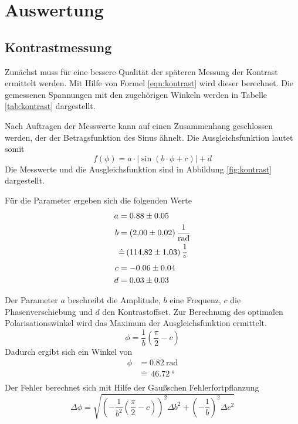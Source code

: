 \section{Auswertung}
\subsection{Kontrastmessung}
Zunächst muss für eine bessere Qualität der späteren Messung der Kontrast
ermittelt werden. Mit Hilfe von Formel \eqref{eqn:kontrast} wird dieser
berechnet. Die gemessenen Spannungen mit den zugehörigen Winkeln werden in
Tabelle \ref{tab:kontrast} dargestellt.



Nach Auftragen der Messwerte kann auf einen Zusammenhang geschlossen werden,
der der Betragsfunktion des Sinus ähnelt. Die Ausgleichsfunktion lautet somit
\begin{equation}
  f(\phi) = a \cdot \lvert \sin(b \cdot \phi +c) \rvert +d
\end{equation}
Die Messwerte und die Ausgleichsfunktion sind in Abbildung \ref{fig:kontrast}
dargestellt.

Für die Parameter ergeben sich die folgenden Werte
\begin{align*}
  a &= 0.88 \pm 0.05 \\
  b &= \SI{2.00 \pm 0.02}{\per\radian} \\
    &\hat{=}\, \SI{114.82 \pm 1.03}{\per\degree} \\
  c &= -0.06 \pm 0.04 \\
  d &= 0.03 \pm 0.03 \\
\end{align*}

Der Parameter $a$ beschreibt die Amplitude, $b$ eine Frequenz, $c$ die
Phasenverschiebung und $d$ den Kontrastoffset.
Zur Berechnung des optimalen Polarisationswinkel wird das Maximum der
Ausgleichsfunktion ermittelt.
\begin{equation}
  \phi = \frac{1}{b} \left(\frac{\pi}{2} -c \right)
\end{equation}
Dadurch ergibt sich ein Winkel von
\begin{align*}
  \phi &= \SI{0.82}{\radian} \\
       &\hat{=} \, \SI{46.72}{\degree} \\
\end{align*}
Der Fehler berechnet sich mit Hilfe der Gaußschen Fehlerfortpflanzung
\begin{equation}
  \Delta \phi =\sqrt{\left(- \frac{1}{b^2} \left(\frac{\pi}{2} -c \right)  \right)^2
  \Delta b^2 + \left(- \frac{1}{b}\right)^2 \Delta c^2}
\end{equation}

